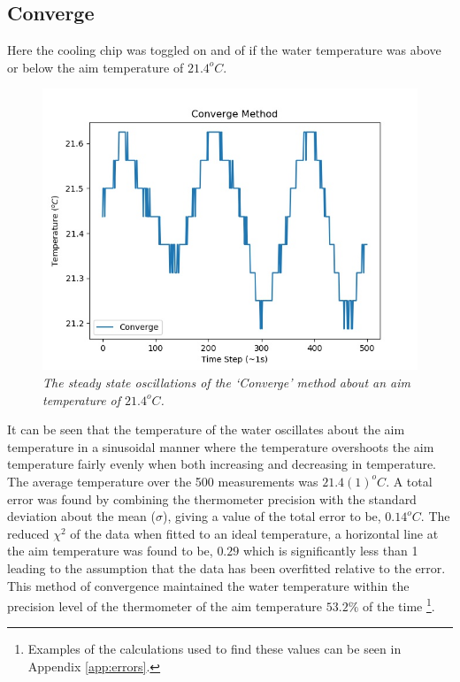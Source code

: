 \documentclass[10pt]{article}
\begin{document}
\subsection*{Converge}
Here the cooling chip was toggled on and of if the water temperature was above or below the aim temperature of $21.4^oC$. \\

\begin{figure}[h!]
    \centering
    \includegraphics[scale=0.75]{converge.jpg}
    \caption{\it{The steady state oscillations of the `Converge' method about an aim temperature of $21.4^oC$.}}
    \label{fig:conv}
\end{figure}

It can be seen that the temperature of the water oscillates about the aim temperature in a sinusoidal manner where the temperature overshoots the aim temperature fairly evenly when both increasing and decreasing in temperature. \\

The average temperature over the 500 measurements was $21.4(1)^oC$. A total error was found by combining the thermometer precision with the standard deviation about the mean ($\sigma$), giving a value of the total error to be, $0.14^oC$. The reduced $\chi^2$ of the data when fitted to an ideal temperature, a horizontal line at the aim temperature was found to be, $0.29$ which is significantly less than 1 leading to the assumption that the data has been overfitted relative to the error. This method of convergence maintained the water temperature within the precision level of the thermometer of the aim temperature $53.2\%$ of the time \footnote{Examples of the calculations used to find these values can be seen in Appendix \ref{app:errors}.}.\\
\end{document}
